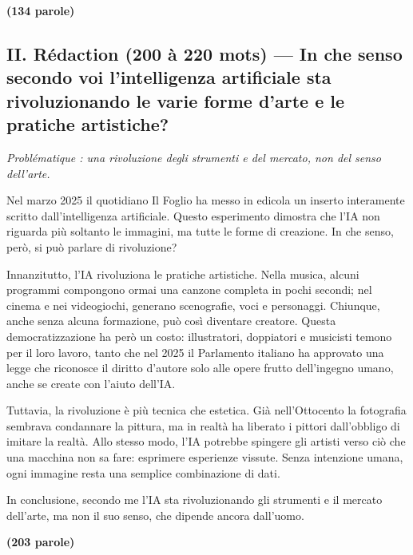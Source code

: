 \documentclass[11pt,a4paper]{article}
\begin{document}
\textbf{(134 parole)}

\hypertarget{ii.-ruxe9daction-200-uxe0-220-mots-in-che-senso-secondo-voi-lintelligenza-artificiale-sta-rivoluzionando-le-varie-forme-darte-e-le-pratiche-artistiche}{%
\subsection{II. Rédaction (200 à 220 mots) --- In che senso secondo voi l'intelligenza artificiale sta rivoluzionando le varie forme d'arte e le pratiche artistiche?}\label{ii.-ruxe9daction-200-uxe0-220-mots-in-che-senso-secondo-voi-lintelligenza-artificiale-sta-rivoluzionando-le-varie-forme-darte-e-le-pratiche-artistiche}}

\emph{Problématique : una rivoluzione degli strumenti e del mercato, non del senso dell'arte.}

Nel marzo 2025 il quotidiano Il Foglio ha messo in edicola un inserto interamente scritto dall'intelligenza artificiale. Questo esperimento dimostra che l'IA non riguarda più soltanto le immagini, ma tutte le forme di creazione. In che senso, però, si può parlare di rivoluzione?

Innanzitutto, l'IA rivoluziona le pratiche artistiche. Nella musica, alcuni programmi compongono ormai una canzone completa in pochi secondi; nel cinema e nei videogiochi, generano scenografie, voci e personaggi. Chiunque, anche senza alcuna formazione, può così diventare creatore. Questa democratizzazione ha però un costo: illustratori, doppiatori e musicisti temono per il loro lavoro, tanto che nel 2025 il Parlamento italiano ha approvato una legge che riconosce il diritto d'autore solo alle opere frutto dell'ingegno umano, anche se create con l'aiuto dell'IA.

Tuttavia, la rivoluzione è più tecnica che estetica. Già nell'Ottocento la fotografia sembrava condannare la pittura, ma in realtà ha liberato i pittori dall'obbligo di imitare la realtà. Allo stesso modo, l'IA potrebbe spingere gli artisti verso ciò che una macchina non sa fare: esprimere esperienze vissute. Senza intenzione umana, ogni immagine resta una semplice combinazione di dati.

In conclusione, secondo me l'IA sta rivoluzionando gli strumenti e il mercato dell'arte, ma non il suo senso, che dipende ancora dall'uomo.

\textbf{(203 parole)}
\end{document}
